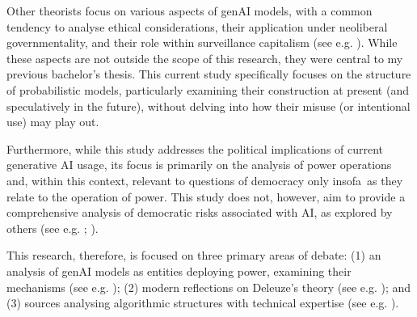 Other theorists focus on various aspects of genAI models, with a common tendency to analyse ethical considerations, their application under neoliberal governmentality, and their role within surveillance capitalism (see e.g. \cite{zuboff2019, gillespie2024, Haggerty2000}). While these aspects are not outside the scope of this research, they were central to my previous bachelor's thesis.  This current study specifically focuses on the structure of probabilistic models, particularly examining their construction at present (and speculatively in the future), without delving into how their misuse (or intentional use) may play out.

Furthermore, while this study addresses the political implications of current generative AI usage, its focus is primarily on the analysis of power operations and, within this context, relevant to questions of democracy only insofa\ as they relate to the operation of power.  This study does not, however, aim to provide a comprehensive analysis of democratic risks associated with AI, as explored by others (see e.g. \cite{zarkadakes2020}; \cite{coeckelbergh2024a}).

This research, therefore, is focused on three primary areas of debate: (1) an analysis of genAI models as entities deploying power, examining their mechanisms (see e.g. \cite{amoore2024, konik2015, mackenzie2021}); (2) modern reflections on Deleuze's theory (see e.g. \cite{mischke2021, poster2010}); and (3) sources analysing algorithmic structures with technical expertise (see e.g. \cite{vaswani2017a, bender2021b}).


%




